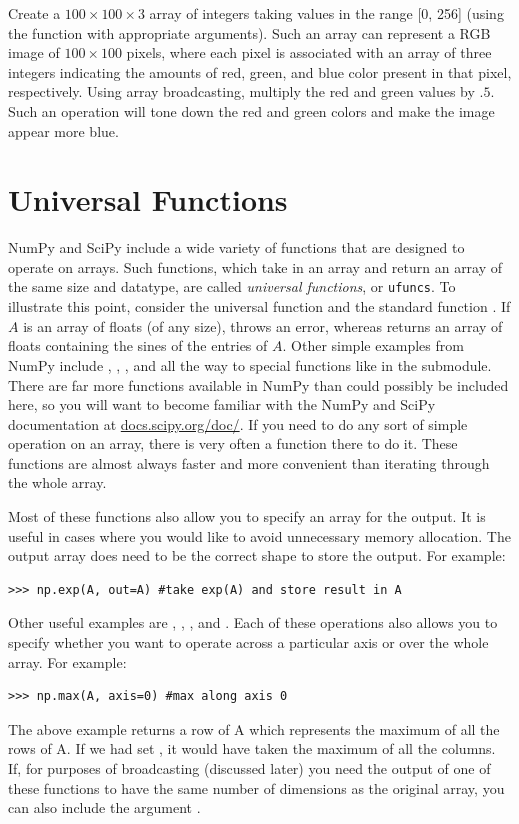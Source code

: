 \begin{problem}
Create a $100\times100\times3$ array of integers taking values in the range [0, 256]
(using the function  with appropriate arguments).
Such an array can represent a RGB image of $100\times100$ pixels, where each pixel
is associated with an array of three integers indicating the amounts of red, green, and blue color present in that pixel, respectively.
Using array broadcasting, multiply the red and green values by $.5$. Such an operation will tone down the red and green colors
and make the image appear more blue.
\end{problem}

\section*{Universal Functions}
NumPy and SciPy include a wide variety of functions that are designed to operate on
arrays.
Such functions, which take in an array and return an array of the same size and
datatype, are called \emph{universal functions}, or \texttt{ufuncs}. To illustrate this point, consider
the universal function  and the standard function . If $A$
is an array of floats (of any size),  throws an error, whereas
 returns an array of floats containing the sines of the entries of $A$.
Other simple examples from NumPy include , , , and
 all the way to special functions like  in the  submodule.
There are far more functions available in NumPy than could possibly be included here, so you will want to become familiar with the NumPy and SciPy documentation at \url{docs.scipy.org/doc/}.
If you need to do any sort of simple operation on an array, there is very often a function there to do it.
These functions are almost always faster and more convenient than iterating through the whole array.

Most of these functions also allow you to specify an array for the output.
It is useful in cases where you would like to avoid unnecessary memory allocation.
The output array does need to be the correct shape to store the output.
For example:
\begin{lstlisting}
>>> np.exp(A, out=A) #take exp(A) and store result in A
\end{lstlisting}

Other useful examples are , , , and .
Each of these operations also allows you to specify whether you want to operate across a particular axis or over the whole array.
For example:
\begin{lstlisting}
>>> np.max(A, axis=0) #max along axis 0
\end{lstlisting}
The above example returns a row of A which represents the maximum of all the rows of A.
If we had set , it would have taken the maximum of all the columns.
If, for purposes of broadcasting (discussed later) you need the output of one of these functions to have the same number of dimensions as the original array, you can also include the argument .

